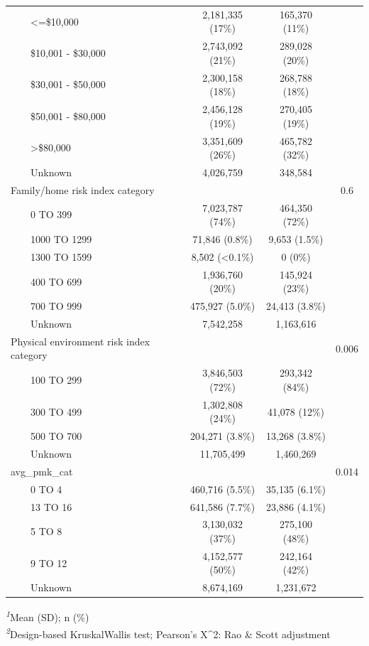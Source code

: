 \documentclass[
]{article}
\begin{document}
\begin{table}[t]
\begin{tabular*}{\linewidth}{@{\extracolsep{\fill}}lccc}
    <=\$10,000 & 2,181,335 (17\%) & 165,370 (11\%) &  \\ 
    \$10,001 - \$30,000 & 2,743,092 (21\%) & 289,028 (20\%) &  \\ 
    \$30,001 - \$50,000 & 2,300,158 (18\%) & 268,788 (18\%) &  \\ 
    \$50,001 - \$80,000 & 2,456,128 (19\%) & 270,405 (19\%) &  \\ 
    >\$80,000 & 3,351,609 (26\%) & 465,782 (32\%) &  \\ 
    Unknown & 4,026,759 & 348,584 &  \\ 
Family/home risk index category &  &  & 0.6 \\ 
    0 TO 399 & 7,023,787 (74\%) & 464,350 (72\%) &  \\ 
    1000 TO 1299 & 71,846 (0.8\%) & 9,653 (1.5\%) &  \\ 
    1300 TO 1599 & 8,502 (<0.1\%) & 0 (0\%) &  \\ 
    400 TO 699 & 1,936,760 (20\%) & 145,924 (23\%) &  \\ 
    700 TO 999 & 475,927 (5.0\%) & 24,413 (3.8\%) &  \\ 
    Unknown & 7,542,258 & 1,163,616 &  \\ 
Physical environment risk index category &  &  & 0.006 \\ 
    100 TO 299 & 3,846,503 (72\%) & 293,342 (84\%) &  \\ 
    300 TO 499 & 1,302,808 (24\%) & 41,078 (12\%) &  \\ 
    500 TO 700 & 204,271 (3.8\%) & 13,268 (3.8\%) &  \\ 
    Unknown & 11,705,499 & 1,460,269 &  \\ 
avg\_pmk\_cat &  &  & 0.014 \\ 
    0 TO 4 & 460,716 (5.5\%) & 35,135 (6.1\%) &  \\ 
    13 TO 16 & 641,586 (7.7\%) & 23,886 (4.1\%) &  \\ 
    5 TO 8 & 3,130,032 (37\%) & 275,100 (48\%) &  \\ 
    9 TO 12 & 4,152,577 (50\%) & 242,164 (42\%) &  \\ 
    Unknown & 8,674,169 & 1,231,672 &  \\ 
\bottomrule
\end{tabular*}
\begin{minipage}{\linewidth}
\textsuperscript{\textit{1}}Mean (SD); n (\%)\\
\textsuperscript{\textit{2}}Design-based KruskalWallis test; Pearson's X\^{}2: Rao \& Scott adjustment\\
\end{minipage}
\end{table}
\end{document}
